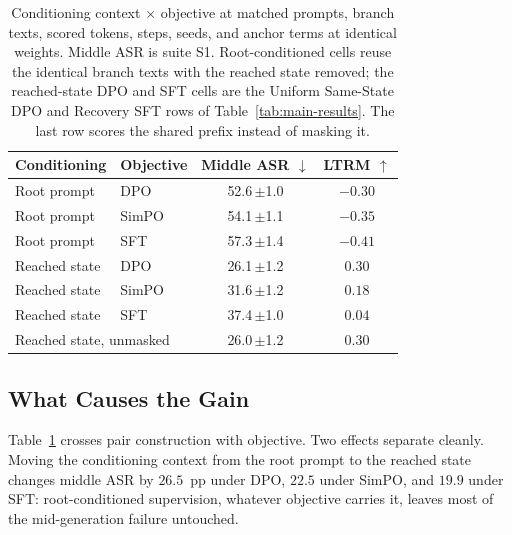 \documentclass[11pt]{article}
\newcommand{\ltrm}{LTRM}
\newcommand{\asr}{ASR}
\begin{document}
\begin{table}[t]
  \centering
  \footnotesize
  \setlength{\tabcolsep}{4pt}
  \begin{tabular}{llcc}
    \toprule
    Conditioning & Objective & Middle \asr{} \(\downarrow\)
    & \ltrm{} \(\uparrow\) \\
    \midrule
    Root prompt  & DPO   & 52.6\,{\scriptsize$\pm$1.0} & $-0.30$ \\
    Root prompt  & SimPO & 54.1\,{\scriptsize$\pm$1.1} & $-0.35$ \\
    Root prompt  & SFT   & 57.3\,{\scriptsize$\pm$1.4} & $-0.41$ \\
    \midrule
    Reached state & DPO   & 26.1\,{\scriptsize$\pm$1.2} & $0.30$ \\
    Reached state & SimPO & 31.6\,{\scriptsize$\pm$1.2} & $0.18$ \\
    Reached state & SFT   & 37.4\,{\scriptsize$\pm$1.0} & $0.04$ \\
    \midrule
    \multicolumn{2}{l}{Reached state, unmasked}
      & 26.0\,{\scriptsize$\pm$1.2} & $0.30$ \\
    \bottomrule
  \end{tabular}
  \caption{Conditioning context \(\times\) objective at matched prompts, branch
  texts, scored tokens, steps, seeds, and anchor terms at identical weights.
  Middle \asr{} is suite S1. Root-conditioned cells reuse the identical branch
  texts with the reached state removed; the reached-state DPO and SFT cells are
  the Uniform Same-State DPO and Recovery SFT rows of
  Table~\ref{tab:main-results}. The last row scores the shared prefix instead
  of masking it.}
  \label{tab:factorial}
\end{table}

\subsection{What Causes the Gain}
\label{sec:results-factorial}

Table~\ref{tab:factorial} crosses pair construction with objective. Two effects
separate cleanly. Moving the conditioning context from the root prompt to the
reached state changes middle \asr{} by \(26.5\)~pp under DPO, \(22.5\) under
SimPO, and \(19.9\) under SFT: root-conditioned supervision, whatever objective
carries it, leaves most of the mid-generation failure untouched.
\end{document}
